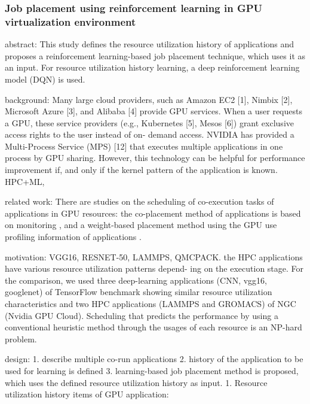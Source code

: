 \documentclass[UTF8]{article}
\begin{document}
\subsubsection{Job placement using reinforcement learning in GPU virtualization environment}

abstract: This study defines the resource utilization history of applications and proposes a reinforcement learning-based job placement technique, which uses it as an input. For resource utilization history learning, a deep reinforcement learning model (DQN) is used. 

background: Many large cloud providers, such as Amazon EC2 [1], Nimbix [2], Microsoft Azure [3], and Alibaba [4] provide GPU services. When a user requests a GPU, these service providers (e.g., Kubernetes [5], Mesos [6]) grant exclusive access rights to the user instead of on- demand access. NVIDIA has provided a Multi-Process Service (MPS) [12] that executes multiple applications in one process by GPU sharing. However, this technology can be helpful for performance improvement if, and only if the kernel pattern of the application is known. HPC+ML, 

related work: There are studies on the scheduling of co-execution tasks of applications in GPU resources: the co-placement method of applications is based on monitoring \cite{chang2017kubernetes,gu2018gaiagpu}, and a weight-based placement method using the GPU use profiling information of applications \cite{hong2017fairgv}.  

motivation:  VGG16, RESNET-50, LAMMPS, QMCPACK. the HPC applications have various resource utilization patterns depend- ing on the execution stage. For the comparison, we used three deep-learning applications (CNN, vgg16, googlenet) of TensorFlow benchmark showing similar resource utilization characteristics and two HPC applications (LAMMPS and GROMACS) of NGC (Nvidia GPU Cloud). Scheduling that predicts the performance by using a conventional heuristic method through the usages of each resource is an NP-hard problem. 

design: 1. describe multiple co-run applications 2. history of the application to be used for learning is defined 3. learning-based job placement method is proposed, which uses the defined resource utilization history as input.   1. Resource utilization history items of GPU application: 
\end{document}
